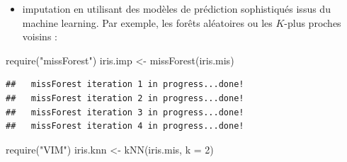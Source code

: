 \documentclass[
]{book}
\newenvironment{Shaded}{\begin{snugshade}}{\end{snugshade}}
\newcommand{\AttributeTok}[1]{\textcolor[rgb]{0.77,0.63,0.00}{#1}}
\newcommand{\ControlFlowTok}[1]{\textcolor[rgb]{0.13,0.29,0.53}{\textbf{#1}}}
\newcommand{\DecValTok}[1]{\textcolor[rgb]{0.00,0.00,0.81}{#1}}
\newcommand{\FunctionTok}[1]{\textcolor[rgb]{0.00,0.00,0.00}{#1}}
\newcommand{\NormalTok}[1]{#1}
\newcommand{\OtherTok}[1]{\textcolor[rgb]{0.56,0.35,0.01}{#1}}
\newcommand{\SpecialCharTok}[1]{\textcolor[rgb]{0.00,0.00,0.00}{#1}}
\newcommand{\StringTok}[1]{\textcolor[rgb]{0.31,0.60,0.02}{#1}}
\providecommand{\tightlist}{%
  \setlength{\itemsep}{0pt}\setlength{\parskip}{0pt}}
\theoremstyle{definition}
\theoremstyle{definition}
\theoremstyle{definition}
\theoremstyle{definition}
\theoremstyle{remark}
\begin{document}
\begin{Shaded}
\end{Shaded}

\begin{itemize}
\tightlist
\item
  imputation en utilisant des modèles de prédiction sophistiqués issus du machine learning. Par exemple, les forêts aléatoires ou les \(K\)-plus proches voisins :
\end{itemize}

\begin{Shaded}
\begin{Highlighting}[]
\FunctionTok{require}\NormalTok{(}\StringTok{"missForest"}\NormalTok{)}
\NormalTok{iris.imp }\OtherTok{\textless{}{-}} \FunctionTok{missForest}\NormalTok{(iris.mis)}
\end{Highlighting}
\end{Shaded}

\begin{verbatim}
##   missForest iteration 1 in progress...done!
##   missForest iteration 2 in progress...done!
##   missForest iteration 3 in progress...done!
##   missForest iteration 4 in progress...done!
\end{verbatim}

\begin{Shaded}
\begin{Highlighting}[]
\FunctionTok{require}\NormalTok{(}\StringTok{"VIM"}\NormalTok{)}
\NormalTok{iris.knn }\OtherTok{\textless{}{-}} \FunctionTok{kNN}\NormalTok{(iris.mis, }\AttributeTok{k =} \DecValTok{2}\NormalTok{)}
\end{Highlighting}
\end{Shaded}
\end{document}
